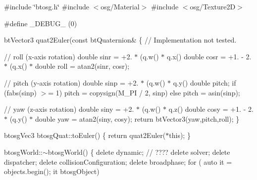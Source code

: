 \begin{DoxyCompactItemize}
\#include \char`\"{}btosg.\+h\char`\"{}
\#include $<$osg/\+Material$>$
\#include $<$osg/\+Texture2\+D$>$

\#define \+\_\+\+D\+E\+B\+U\+G\+\_\+ (0)

bt\+Vector3 quat2\+Euler(const bt\+Quaternion\&
\{
    // Implementation not tested.

    // roll (x-\/axis rotation)
    double sinr = +2. $\ast$ (q.\+w() $\ast$ q.\+x() 
    double cosr = +1. -\/ 2. $\ast$ (q.\+x() $\ast$ 
    double roll = atan2(sinr, cosr);

    // pitch (y-\/axis rotation)
    double sinp = +2. $\ast$ (q.\+w() $\ast$ q.\+y() 
    double pitch;
    if (fabs(sinp) $>$= 1)
        pitch = copysign(\+M\+\_\+\+P\+I / 2, sinp)
    else
        pitch = asin(sinp);

    // yaw (z-\/axis rotation)
    double siny = +2. $\ast$ (q.\+w() $\ast$ q.\+z() 
    double cosy = +1. -\/ 2. $\ast$ (q.\+y() $\ast$ 
    double yaw = atan2(siny, cosy);
    return bt\+Vector3(yaw,pitch,roll);
\}

btosg\+Vec3 btosg\+Quat\+::to\+Euler()
\{
    return quat2\+Euler($\ast$this);
\}


btosg\+World\+::$\sim$btosg\+World() \{
    delete dynamic; // ????
    delete solver;
    delete dispatcher;
    delete collision\+Configuration;
    delete broadphase;
    for ( auto it = objects.\+begin(); it 
        btosg\+Object)\end{DoxyCompactItemize}
